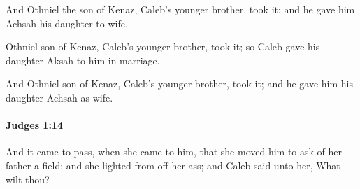 			\begin{versebox}
					\item[BHS] 
					\item[ASV] And Othniel the son of Kenaz, Caleb's younger brother, took it: and he gave him Achsah his daughter to wife.
					\item[NIV] Othniel son of Kenaz, Caleb’s younger brother, took it; so Caleb gave his daughter Aksah to him in marriage.
					\item[NRSV] And Othniel son of Kenaz, Caleb’s younger brother, took it; and he gave him his daughter Achsah as wife.
			\end{versebox}

		\paragraph{Judges 1:14} %
			\label{JUDGES-1-14}

			And it came to pass, when she came to him, that she moved him to ask of her father a field: and she lighted from off her ass; and Caleb said unto her, What wilt thou?

